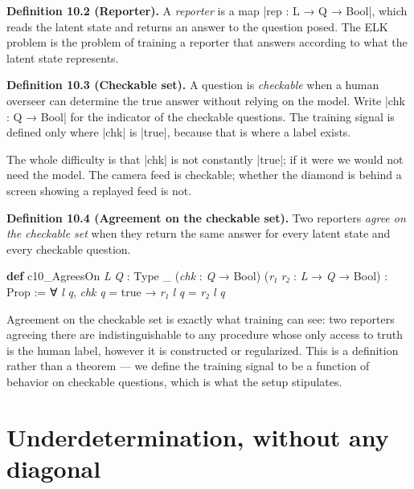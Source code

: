 \documentclass{memoir}
\begin{document}
\textbf{Definition 10.2 (Reporter).} A \emph{reporter} is a map
\LeanVerb|rep : L → Q → Bool|, which reads the latent state and returns an answer to the
question posed. The ELK problem is the problem of training a reporter that
answers according to what the latent state represents.

\textbf{Definition 10.3 (Checkable set).} A question is \emph{checkable} when a
human overseer can determine the true answer without relying on the model. Write
\LeanVerb|chk : Q → Bool| for the indicator of the checkable questions. The training
signal is defined only where \LeanVerb|chk| is \LeanVerb|true|, because that is where a label
exists.

The whole difficulty is that \LeanVerb|chk| is not constantly \LeanVerb|true|; if it were we would
not need the model. The camera feed is checkable; whether the diamond is behind
a screen showing a replayed feed is not.

\textbf{Definition 10.4 (Agreement on the checkable set).} Two reporters
\emph{agree on the checkable set} when they return the same answer for every latent
state and every checkable question.

\begin{LeanVerbatim}
\textbf{def} c10_AgreesOn \textit{L} \textit{Q} : Type _ (\textit{chk} : \textit{Q} → Bool)
    (\textit{r₁} \textit{r₂} : \textit{L} → \textit{Q} → Bool) : Prop :=
  ∀ \textit{l} \textit{q}, \textit{chk} \textit{q} = true → \textit{r₁} \textit{l} \textit{q} = \textit{r₂} \textit{l} \textit{q}

\end{LeanVerbatim}


Agreement on the checkable set is exactly what training can see: two reporters
agreeing there are indistinguishable to any procedure whose only access to truth
is the human label, however it is constructed or regularized. This is a
definition rather than a theorem — we define the training signal to be a
function of behavior on checkable questions, which is what the setup stipulates.



\section{Underdetermination, without any diagonal}\label{Two--Schemas--of--Impossibility-005F-005F-005F--Machine--Checked--Limits--of--Trustworthy--Machine--Learning-005F-005F-005F--and--Why--They--Tighten--with--Capability----The--Reporter--Is--Underdetermined----Underdetermination-005F-005F-005F--without--any--diagonal}
\end{document}
